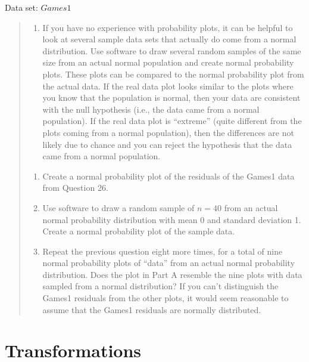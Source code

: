 \documentclass[
]{report}
\providecommand{\tightlist}{%
  \setlength{\itemsep}{0pt}\setlength{\parskip}{0pt}}
\begin{document}
Data set: \(Games1\)

\begin{quote}
\begin{enumerate}
\def\labelenumi{\arabic{enumi}.}
\setcounter{enumi}{29}
\tightlist
\item
  If you have no experience with probability plots, it can be helpful to look at several sample data sets that actually do come from a normal distribution. Use software to draw several random samples of the same size from an actual normal population and create normal probability plots. These plots can be compared to the normal probability plot from the actual data. If the real data plot looks similar to the plots where you know that the population is normal, then your data are consistent with the null hypothesis (i.e., the data came from a normal population). If the real data plot is ``extreme'' (quite different from the plots coming from a normal population), then the differences are not likely due to chance and you can reject the hypothesis that the data came from a normal population.\\
\end{enumerate}

\begin{enumerate}
\def\labelenumi{\alph{enumi}.}
\tightlist
\item
  Create a normal probability plot of the residuals of the Games1 data from Question 26.\\
\item
  Use software to draw a random sample of \(n = 40\) from an actual normal probability distribution with mean 0 and standard deviation 1. Create a normal probability plot of the sample data.\\
\item
  Repeat the previous question eight more times, for a total of nine normal probability plots of ``data'' from an actual normal probability distribution. Does the plot in Part A resemble the nine plots with data sampled from a normal distribution? If you can't distinguish the Games1 residuals from the other plots, it would seem reasonable to assume that the Games1 residuals are normally distributed.
\end{enumerate}
\end{quote}

\section{\texorpdfstring{\textbf{Transformations}}{Transformations}}\label{transformations}
\end{document}

